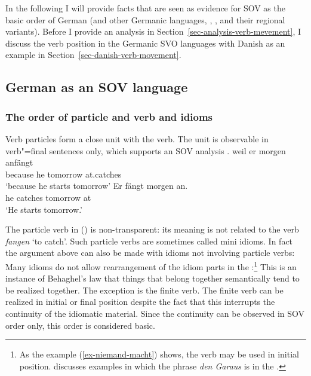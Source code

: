 In the following I will provide facts that are seen as evidence for SOV as the basic order of German
(and other Germanic languages, \eg {}, ,  and their regional
variants). Before I provide an analysis in Section~\ref{sec-analysis-verb-mevement}, I discuss the 
verb position in the Germanic SVO languages with Danish as an example in Section~\ref{sec-danish-verb-movement}.

\subsection{German as an SOV language}
\label{sec-German-as-SOV}

\subsubsection{The order of particle and verb and idioms}

Verb particles form a close unit with the verb. The unit is observable in verb"=final sentences only,
which supports an SOV analysis \citep[]{Bierwisch63a}. 
\eal
\ex 
\gll weil er morgen anfängt\\
     because he tomorrow at.catches\\
\glt `because he starts tomorrow'
\ex 
\gll Er fängt morgen an.\\
     he catches tomorrow at\\
\glt `He starts tomorrow.'
\zl

\noindent
The particle verb in () is non-transparent: its meaning is not related to the verb
\emph{fangen} `to catch'. Such particle verbs are sometimes called mini
idioms. In fact the argument above can also be made with idioms not involving particle verbs: Many idioms do not allow
rearrangement of the idiom parts in the \mf:\footnote{
  As the example (\ref{ex-niemand-macht}) shows, the verb may be used in initial position. \citet[]{MuellerLehrbuch3} discusses examples in which the phrase \emph{den Garaus} is in the \vf.
}
\eal
{}
\zl
This is an instance of Behaghel's law \citeyearpar{Behaghel32-u}
that things that belong together semantically tend to be realized together. The exception is the
finite verb. The finite verb can be realized in initial or final position despite the fact that this
interrupts the continuity of the idiomatic material. Since the continuity can be observed in SOV
order only, this order is considered basic.

